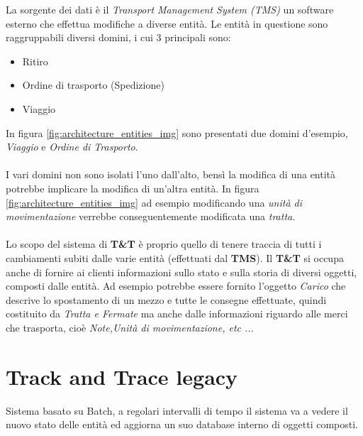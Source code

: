 La sorgente dei dati è il \textit{Transport Management System (TMS)} un software esterno che effettua modifiche a diverse entità.
Le entità in questione sono raggruppabili diversi domini, i cui 3 principali sono:
\begin{itemize}
    \item Ritiro
    \item Ordine di trasporto (Spedizione)
    \item Viaggio
\end{itemize}
In figura \ref{fig:architecture_entities_img} sono presentati due domini d'esempio, \textit{Viaggio} e \textit{Ordine di Trasporto}.
\\
\\
I vari domini non sono isolati l'uno dall'alto, bensì la modifica di una entità potrebbe implicare la modifica di un'altra entità. In figura \ref{fig:architecture_entities_img} ad esempio modificando una \textit{unità di movimentazione} verrebbe conseguentemente modificata una \textit{tratta}.
\\
\\
Lo scopo del sistema di \textbf{T\&T} è proprio quello di tenere traccia di tutti i cambiamenti subiti dalle varie entità (effettuati dal \textbf{TMS}).
Il \textbf{T\&T} si occupa anche di fornire ai clienti informazioni sullo stato e sulla storia di diversi oggetti, composti dalle entità. Ad esempio potrebbe essere fornito l'oggetto \textit{Carico} che descrive lo spostamento di un mezzo e tutte le consegne effettuate, quindi costituito da \textit{Tratta e Fermate} ma anche dalle informazioni riguardo alle merci che trasporta, cioè \textit{Note,Unità di movimentazione, etc ...}

\section{Track and Trace legacy}
\label{sec:T&T_old}
Sistema basato su Batch, a regolari intervalli di tempo il sistema va a vedere il nuovo stato delle entità ed aggiorna un suo database interno di oggetti composti.

